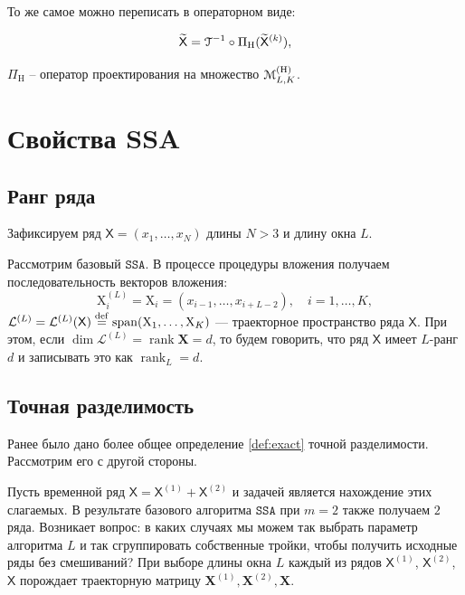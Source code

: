 \documentclass[12pt, specialist, subf
]{disser}
\theoremstyle{definition}
\newcommand{\SSA}{\texttt{SSA}}
\newcommand{\TS}{\mathsf{X}}
\newcommand{\MH}{\EuScript{M}_{L,K}^{(\mathrm{H})}}
\newcommand{\PH}{\Pi_{\mathrm{H}}}
\begin{document}
То же самое можно переписать в операторном виде:

\begin{equation*}
	\widetilde{\TS} = \EuScript{T}^{-1} \circ \PH (\widetilde{\TS}^{(k)}),
\end{equation*}


$\PH$ -- оператор проектирования на множество $\MH$.


\section{Свойства SSA}


\subsection{Ранг ряда}
\label{subsubsec: ssa_rank}
Зафиксируем ряд $\TS = (x_1, \dots, x_{N})$ длины $N > 3$ и длину окна $L$.

Рассмотрим базовый $\SSA$. В процессе процедуры вложения получаем последовательность векторов вложения:
\begin{equation*}
	\mathrm{X}_i^{(L)} = \mathrm{X}_i = (x_{i-1}, \dots, x_{i+L-2}), \quad i = 1, \dots, K,
\end{equation*}
$\mathcal{L}^{(L)} = \mathcal{L}^{(L)}(\TS) \stackrel{{\rm def}}{{=}} \operatorname{span}(\mathrm X_{1}, \ldots, \mathrm X_{K})$ --- траекторное пространство ряда $\TS$.
При этом, если $\dim \mathcal{L}^{(L)}= \operatorname{rank} \mathbf X = d$, то будем говорить, что ряд $\TS$ имеет $L$-ранг $d$ и записывать это как $\operatorname{rank}_L = d$.

\subsection{Точная разделимость}

Ранее было дано более общее определение \ref{def:exact} точной разделимости. Рассмотрим его с другой стороны.

Пусть временной ряд  $\TS = \TS^{(1)} + \TS^{(2)}$ и задачей является нахождение этих слагаемых. В результате базового алгоритма $\SSA$ при $m = 2$ также получаем $2$ ряда. Возникает вопрос: в каких случаях мы можем так выбрать параметр алгоритма $L$ и так сгруппировать собственные тройки, чтобы получить исходные ряды без смешиваний?
При выборе длины окна $L$ каждый из рядов $\TS^{(1)}$, $\TS^{(2)}$, $\TS$ порождает траекторную матрицу $\mathbf{X}^{(1)}, \mathbf{X}^{(2)}, \mathbf{X}$.
\end{document}
